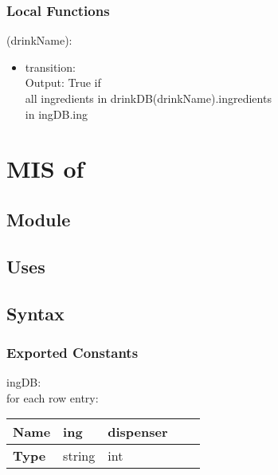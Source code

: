 \documentclass[12pt, titlepage]{article}
\begin{document}
\subsubsection{Local Functions}

\noindent {}(drinkName):
\begin{itemize}
\item transition:\\Output: True if \\ all ingredients in drinkDB(drinkName).ingredients \\ in ingDB.ing
\end{itemize}

\newpage

\section{MIS of } \label{Module}

\subsection{Module}

\subsection{Uses}


\subsection{Syntax}

\subsubsection{Exported Constants}

ingDB:\\
for each row entry:\\
\begin{center}
\begin{tabular}{p{2cm} p{3cm} p{3cm} p{3cm} p{3cm}}
\hline
\textbf{Name} & ing & dispenser \\
\hline
\textbf{Type} & string & int \\
\hline
\end{tabular}
\end{center}
\end{document}
